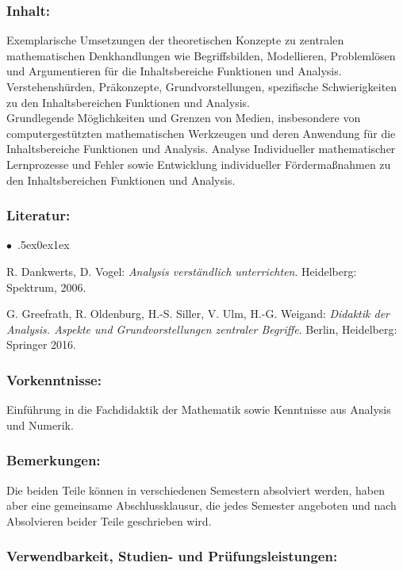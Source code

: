 \documentclass[a4paper,10pt]{article}
\renewenvironment{itemize}{\begin{list}{$\bullet$\ }{\itemsep.5ex\setlength{\topsep}{0.5\itemsep}\parsep0ex\labelsep1ex\settowidth{\labelwidth}{$\bullet$\ }\setlength{\leftmargin}{\labelwidth}\addtolength{\leftmargin}{3ex}\addtolength{\leftmargin}{\labelsep}}}{\end{list}}
\begin{document}
\subsubsection*{\large
    Inhalt:
}
Exemplarische Umsetzungen der theoretischen Konzepte zu zentralen mathematischen Denkhandlungen wie Begriffsbilden, Modellieren, Problemlösen und Argumentieren für die Inhaltsbereiche Funktionen und Analysis. \\
Verstehenshürden, Präkonzepte, Grundvorstellungen, spezifische Schwierigkeiten zu den Inhaltsbereichen Funktionen
und Analysis. \\
Grundlegende Möglichkeiten und Grenzen von Medien, insbesondere von computergestützten mathematischen Werkzeugen und deren Anwendung für die Inhaltsbereiche Funktionen und Analysis.
Analyse Individueller mathematischer Lernprozesse und Fehler sowie Entwicklung individueller Fördermaßnahmen zu
den Inhaltsbereichen Funktionen und Analysis.
\subsubsection*{\large
    Literatur:
}
\begin{itemize}
\item
R. Dankwerts, D. Vogel: \emph{Analysis verständlich unterrichten}. Heidelberg: Spektrum, 2006. 
 \item
G. Greefrath, R. Oldenburg, H.-S. Siller, V. Ulm, H.-G. Weigand: \emph{Didaktik der Analysis. Aspekte und Grundvorstellungen zentraler Begriffe}. Berlin, Heidelberg: Springer 2016.
\end{itemize}
\subsubsection*{\large
    Vorkenntnisse:
}
Einführung in die Fachdidaktik der Mathematik sowie Kenntnisse aus Analysis und Numerik.
\subsubsection*{\large
    Bemerkungen:
}
Die beiden Teile können in verschiedenen Semestern absolviert werden, haben aber eine gemeinsame Abschlussklausur,
die jedes Semester angeboten und nach Absolvieren beider Teile geschrieben wird.
\subsubsection*{\large
    Verwendbarkeit, Studien- und Prüfungsleistungen:
}
\end{document}
